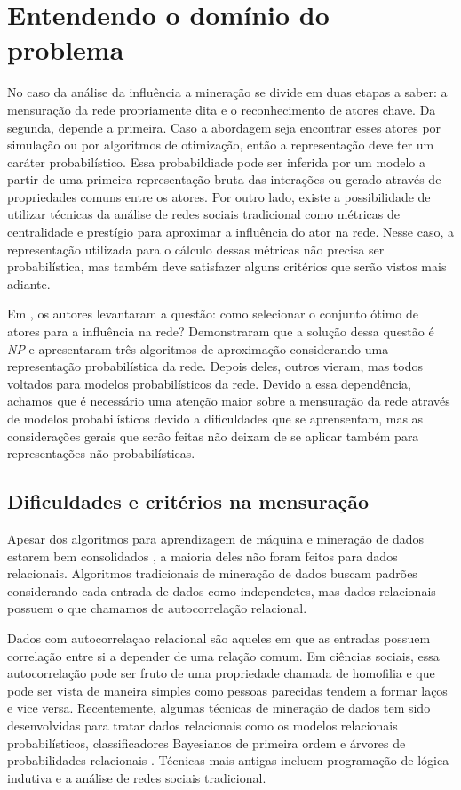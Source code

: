 \chapter{Entendendo o domínio do problema}
\label{ch:dominio}

No caso da análise da influência a mineração se divide em duas etapas a saber: a
mensuração da rede propriamente dita e o reconhecimento de atores chave. Da
segunda, depende a primeira. Caso a abordagem seja encontrar esses atores por
simulação ou por algoritmos de otimização, então a representação deve ter um
caráter probabilístico. Essa probabildiade pode ser inferida por um modelo a
partir de uma primeira representação bruta das interações ou gerado através de
propriedades comuns entre os atores. Por outro lado, existe a possibilidade de
utilizar técnicas da análise de redes sociais tradicional como métricas de
centralidade e prestígio para aproximar a influência do ator na rede. Nesse caso, a
representação utilizada para o cálculo dessas métricas não precisa ser
probabilística, mas também deve satisfazer alguns critérios que serão vistos
mais adiante.

Em \cite{Domingos2001}, os autores levantaram a questão: como selecionar o
conjunto ótimo de atores para a influência na rede? Demonstraram que a solução
dessa questão é \textit{NP} e apresentaram três algoritmos de aproximação
considerando uma representação probabilística da rede. Depois deles, outros
vieram, mas todos voltados para modelos probabilísticos da rede. Devido a essa
dependência, achamos que é necessário uma atenção maior sobre a mensuração da
rede através de modelos probabilísticos devido a dificuldades que se
aprensentam, mas as considerações gerais que serão feitas não deixam de
se aplicar também para representações não probabilísticas.

\section{Dificuldades e critérios na mensuração}

Apesar dos algoritmos para aprendizagem de máquina e mineração de
dados estarem bem consolidados \citep{Cios2005}, a maioria deles não foram
feitos para dados relacionais. Algoritmos tradicionais de mineração de dados buscam
padrões considerando cada entrada de dados como independetes, mas dados
relacionais possuem o que chamamos de autocorrelação relacional.

Dados com autocorrelaçao relacional são aqueles em que as entradas possuem
correlação entre si a depender de uma relação comum. Em ciências sociais, essa
autocorrelação pode ser fruto de uma propriedade chamada de homofilia e que
pode ser vista de maneira simples como pessoas parecidas tendem a formar laços
e vice versa. Recentemente, algumas técnicas de mineração de dados tem sido
desenvolvidas para tratar dados relacionais como os modelos relacionais
probabilísticos, classificadores Bayesianos de primeira ordem e árvores de
probabilidades relacionais \citep{Jensen2003}. Técnicas mais antigas incluem
programação de lógica indutiva e a análise de redes sociais tradicional.

